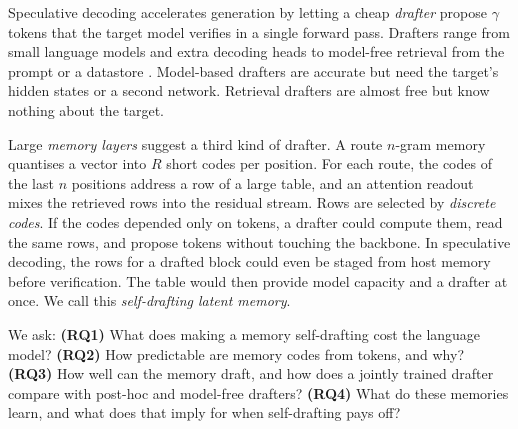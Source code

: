 \documentclass[11pt]{article}
\newcommand{\Lngram}{\textsc{Lngram}}
\begin{document}
Speculative decoding \citep{leviathan2023fast,chen2023accelerating} accelerates generation by letting a cheap
\emph{drafter} propose $\gamma$ tokens that the target model verifies in a single forward pass. Drafters range from small
language models and extra decoding heads \citep{stern2018blockwise,cai2024medusa,li2024eagle} to model-free retrieval
from the prompt or a datastore \citep{saxena2023pld,he2024rest,fu2024lookahead}. Model-based drafters are accurate but
need the target's hidden states or a second network. Retrieval drafters are almost free but know nothing about the
target.

Large \emph{memory layers} \citep{lample2019pkm,berges2024memory} suggest a third kind of drafter. A route $n$-gram memory
\citep[\Lngram;][]{lngram} quantises a vector into $R$ short codes per position. For each route, the codes of the last $n$
positions address a row of a large table, and an attention readout mixes the retrieved rows into the residual stream.
Rows are selected by \emph{discrete codes}. If the codes depended only on tokens, a drafter could compute them, read the
same rows, and propose tokens without touching the backbone. In speculative decoding, the rows for a drafted block
could even be staged from host memory before verification. The table would then provide model capacity and a drafter
at once. We call this \emph{self-drafting latent memory}.

We ask:
\textbf{(RQ1)} What does making a memory self-drafting cost the language model?
\textbf{(RQ2)} How predictable are memory codes from tokens, and why?
\textbf{(RQ3)} How well can the memory draft, and how does a jointly trained drafter compare with post-hoc and
model-free drafters?
\textbf{(RQ4)} What do these memories learn, and what does that imply for when self-drafting pays off?
\end{document}

